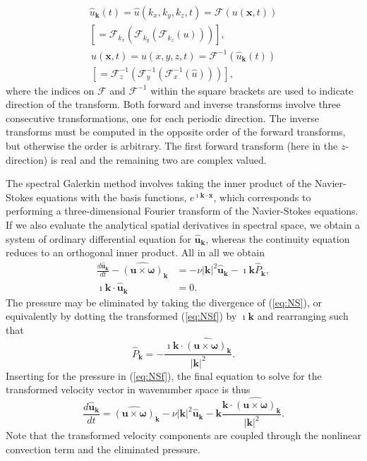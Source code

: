 \documentclass[final,3p,times,twocolumn]{elsarticle}
\begin{document}
\begin{multline}
\hat{u}_{\bm{k}}(t) = \hat{{u}}(k_x, k_y, k_z, t) = \mathcal{F}({u}(\bm{x}, 
t)) 
\\ \left[= \mathcal{F}_{k_x} \left(\mathcal{F}_{k_y} \left( \mathcal{F}_{k_z} 
({u}) \right) \right) \right], \label{eq:fft}
\end{multline}
\begin{multline}
{u}(\bm{x}, t) = {u}(x, y, z, t) = \mathcal{F}^{-1}(\hat{{u}}_{\bm{k}}(t)) \\ 
\left[= 
\mathcal{F}^{-1}_{z}\left(\mathcal{F}^{-1}_{y}\left(\mathcal{F}^{-1}_{x}(\hat{{u}})\right)\right)\right],
 \label{eq:ifft}
\end{multline}
where the indices on $\mathcal{F}$ and $\mathcal{F}^{-1}$ within the square 
brackets are used to indicate direction of the transform. Both forward and 
inverse transforms involve three consecutive transformations, one for each 
periodic direction. The inverse transforms must be computed in the opposite 
order of the forward transforms, but otherwise the order is arbitrary. The 
first forward transform (here in the $z$-direction) is real and the remaining 
two are complex valued.



The spectral Galerkin method involves taking the inner product of the Navier-Stokes equations with the basis functions, $e^{\imath \bm{k} \cdot \bm{x}}$, which corresponds to performing a three-dimensional Fourier transform of the Navier-Stokes equations. If we also evaluate the analytical spatial derivatives in spectral space, we obtain a system of ordinary differential equation for $\hat{\bm{u}}_{\bm{k}}$, whereas the continuity equation reduces to an orthogonal inner product. All in all we obtain
\begin{align}
 \frac{d\hat{\bm{u}}_{\bm{k}}}{d t} - \widehat{( \bm{u} \times \bm{\omega})}_{\bm{k}} &= - \nu |\bm{k}|^2  \hat{\bm{u}}_{\bm{k}} - \imath \bm{k} \hat{P}_{\bm{k}}, \label{eq:NSf} \\
 \imath \bm{k} \cdot \hat{\bm{u}}_{\bm{k}} &= 0.
\end{align}
The pressure may be eliminated by taking the divergence of (\ref{eq:NS}), or equivalently by dotting the transformed (\ref{eq:NSf}) by $\imath \bm{k}$ and rearranging such that
\begin{equation}
\hat{P}_{\bm{k}} = - \frac{\imath\bm{k} \cdot \widehat{( \bm{u} \times \bm{\omega})}_{\bm{k}} }{|\bm{k}|^2}.
\label{eq:mod_pressure}
\end{equation}
Inserting for the pressure in (\ref{eq:NSf}), the final equation to solve for the transformed velocity vector in wavenumber space is thus
\begin{equation}
 \frac{d\hat{\bm{u}}_{\bm{k}}}{d t}  = \widehat{( \bm{u} \times \bm{\omega})}_{\bm{k}} - \nu |\bm{k}|^2  \hat{\bm{u}}_{\bm{k}} - \bm{k} \frac{\bm{k} \cdot \widehat{( \bm{u} \times \bm{\omega})}_{\bm{k}} }{|\bm{k}|^2}. \label{eq:NSfinal}
\end{equation}
Note that the transformed velocity components are coupled through the nonlinear convection term and the eliminated pressure.
\end{document}
